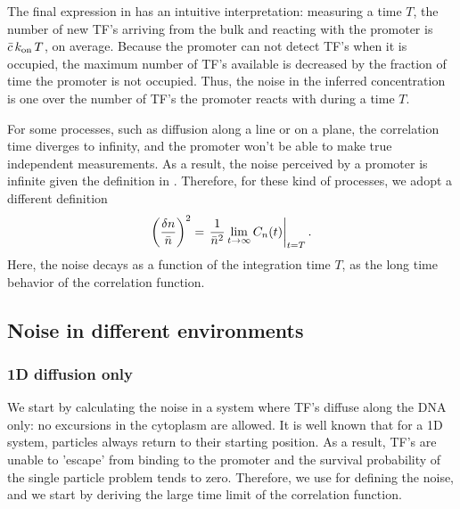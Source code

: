 The final expression in  has an intuitive interpretation: measuring a time $T$, the number of new TF's arriving from the bulk and reacting with the promoter is $\bar{c}\,k_{\rm on}\,T$, on average.  Because the promoter can not detect TF's when it is occupied, the maximum number of TF's available is decreased by the fraction of time the promoter is not occupied. Thus, the noise in the inferred concentration is one over the number of TF's the promoter reacts with during a time $T$.

For some processes, such as diffusion along a line or on a plane, the correlation time diverges to infinity, and the promoter won't be able to make true independent measurements. As a result, the noise perceived by a promoter is infinite given the definition in . Therefore, for these kind of processes, we adopt a different definition
\begin{equation}
  \left( \frac{\delta n}{\bar{n}} \right)^2 = \left. \frac{1}{\bar{n}^2} \lim_{t \to \infty} C_n(t)  \right|_{t = T}.
  \elabel{EqProNoiseII}
\end{equation}
Here, the noise decays as a function of the integration time $T$, as the long time behavior of the correlation function.


\subsection{Noise in different environments}

\subsubsection{1D diffusion only}
We start by calculating the noise in a system where TF's diffuse along the DNA only: no excursions in the cytoplasm are allowed. It is well known \cite{Redner2001} that for a 1D system, particles always return to their starting position. As a result, TF's are unable to 'escape' from binding to the promoter and the survival probability of the single particle problem tends to zero. Therefore, we use  for defining the noise, and we start by deriving the large time limit of the correlation function.

